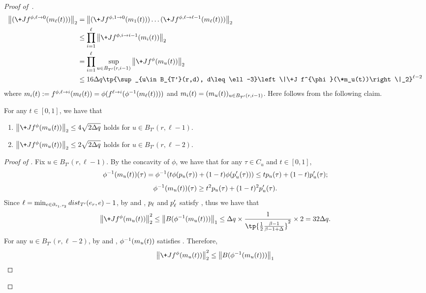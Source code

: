 \documentclass[a4paper,11pt]{article}
\renewcommand{\norm}[1]{\left\|#1\right\|}
\begin{document}
\begin{proof}[Proof of~]
\begin{align}
    \nonumber \norm{ (\+J f^{\phi,\ell\ra 0}(\*m_\ell(t)))}_2 &= \norm{(\+J f^{\phi,1\ra 0}(\*m_1(t)))\dots (\+J f^{\phi,\ell\ra \ell-1}(\*m_\ell(t)))  }_2
    \\\nonumber &\leq \prod_{i=1}^{\ell}\norm{\+J f^{\phi,i\ra i-1}(\*m_i(t))}_2
\\\nonumber &= \prod_{i=1}^{\ell}\sup_{u\in B_{T'}(r,i-1)}\norm{\+J f^{\phi}(\*m_u(t))}_2
    \\\label{eq:apply_trivial_bound} &\leq 16\Delta q \tp{\sup_{u\in B_{T'}(r,d), d\leq \ell-3}\norm{\+J f^{\phi}(\*m_u(t))}_2}^{\ell-2}
\end{align}
where $\*m_i(t) := f^{\phi,\ell\ra i}(\*m_\ell(t)) = \phi(f^{\ell\ra i}(\phi^{-1}(\*m_\ell(t))))$ and $\*m_i(t) = (\*m_u(t))_{u\in B_{T'}(r,i-1)}$.
Here  follows from the following claim.
\begin{claim}\label{claim:trivial_bound}
    For any $t\in [0,1]$, we have that
    \begin{enumerate}
    \item $\norm{\+J f^\phi(\*m_u(t))}_2 \leq 4\sqrt{2\Delta q}$ holds for $u\in B_{T'}(r,\ell-1)$.
    \item $\norm{\+J f^\phi(\*m_u(t))}_2 \leq 2\sqrt{2\Delta q}$ holds for $u\in B_{T'}(r,\ell-2)$.
    \end{enumerate}
\end{claim}
\begin{proof}[Proof of ]
    Fix $u\in B_{T'}(r,\ell-1)$.
    By the concavity of $\phi$, we have that for any $\tau \in C_u$ and $t\in [0,1]$,
    $$
        \phi^{-1}(\*m_u(t))(\tau)
        = \phi^{-1}(t \phi(\*p_u(\tau)) + (1-t)\phi(\*p_u'(\tau)))
        \leq t \*p_u(\tau) + (1-t)\*p_u'(\tau);
    $$
    $$
        \phi^{-1}(\*m_u(t))(\tau)
        \geq t^2\*p_u(\tau) + (1-t)^2\*p_u'(\tau).
    $$
    Since $\ell = \min_{e\in \partial_{\tau_1,\tau_2}} \-{dist}_{T'}(e_r,e) - 1$, by  and , $\*p_\ell$ and $\*p_\ell'$ satisfy , thus we have that
    $$
        \norm{\+J f^\phi(\*m_u(t))}_2^2 \leq \norm{\*B(\phi^{-1}(\*m_u(t)))}_1
        \leq \Delta q\times \frac{1}{\tp{\frac 12 \frac{\beta -1}{\beta -1 + \Delta}}^2}\times 2
        = 32 \Delta q.
    $$
    For any $u\in B_{T'}(r,\ell-2)$, by  and , $\phi^{-1}(\*m_u(t))$ satisfies .
    Therefore, 
    \[
        \norm{\+J f^\phi(\*m_u(t))}_2^2 \leq \norm{\*B(\phi^{-1}(\*m_u(t)))}_1
\]
\end{proof}
\end{proof}
\end{document}
